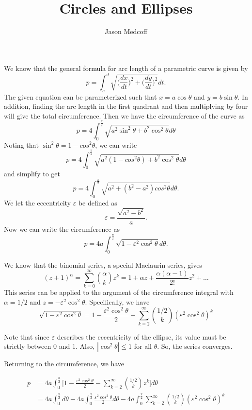 \documentclass[12pt]{amsart}
\title{Circles and Ellipses}
\author{Jason Medcoff}
\theoremstyle{case}
\begin{document}
	\maketitle
	
	We know that the general formula for arc length of a parametric curve is given by
	$$ p = \int_{c}^{d} \sqrt{ \Big( \frac{dx}{dt} \Big) ^2 + \Big( \frac{dy}{dt} \Big) ^2} dt . $$	
	The given equation can be parameterized such that $x = a\cos\theta$ and $y = b\sin\theta$. In addition, finding the arc length in the first quadrant and then multiplying by four will give the total circumference. Then we have the circumference of the curve as
	$$ p = 4 \int_{0}^{\frac{\pi}{2}} \sqrt{ a^2\sin^2\theta + b^2\cos^2\theta } d\theta $$
	Noting that $\sin^2\theta = 1 - cos^2\theta$, we can write
	$$ p = 4 \int_{0}^{\frac{\pi}{2}} \sqrt{ a^2(1 - cos^2\theta) + b^2\cos^2\theta } d\theta $$
	and simplify to get
	$$ p = 4 \int_{0}^{\frac{\pi}{2}} \sqrt{ a^2 + (b^2 - a^2)cos^2\theta } d\theta . $$
	We let the eccentricity $\varepsilon$ be defined as
	$$ \varepsilon = \frac{\sqrt{a^2-b^2}}{a} . $$
	Now we can write the circumference as
	$$ p = 4a \int_{0}^{\frac{\pi}{2}} \sqrt{ 1 - \varepsilon^2\cos^2\theta } d\theta . $$
	
	We know that the binomial series, a special Maclaurin series, gives
	$$ (z+1)^\alpha = \sum_{k=0}^{\infty} \binom{\alpha}{k} z^k = 1 + \alpha z + \frac{\alpha(\alpha - 1)}{2!} z^2 + \dots $$
	This series can be applied to the argument of the circumference integral with $\alpha = 1/2$ and $z = -\varepsilon^2\cos^2\theta$. Specifically, we have
	$$ \sqrt{ 1 - \varepsilon^2\cos^2\theta } = 1 - \frac{\varepsilon^2\cos^2\theta}{2} - \sum_{k=2}^{\infty} \binom{1/2}{k} (\varepsilon^2 \cos^2\theta)^k $$
	
	Note that since $\varepsilon$ describes the eccentricity of the ellipse, its value must be strictly between 0 and 1. Also, $|\cos^2\theta| \leq 1$ for all $\theta$. So, the series converges.
	
	Returning to the circumference, we have
	
	\begin{equation*}
	\begin{split}
	p & = 4a \int_{0}^{\frac{\pi}{2}} \Bigg[ 1 - \frac{\varepsilon^2\cos^2\theta}{2} - \sum_{k=2}^{\infty} \binom{1/2}{k} z^k \Bigg] d\theta \\
	& = 4a \int_{0}^{\frac{\pi}{2}} d\theta - 4a \int_{0}^{\frac{\pi}{2}} \frac{\varepsilon^2\cos^2\theta}{2} d\theta - 4a \int_{0}^{\frac{\pi}{2}} \sum_{k=2}^{\infty} \binom{1/2}{k} (\varepsilon^2 \cos^2\theta)^k
	\end{split}
	\end{equation*}
	
	
	
	
	
	
	
	
	
\end{document}
